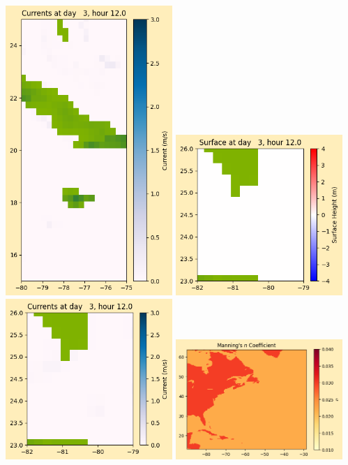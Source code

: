 \documentclass[11pt]{article}
\begin{document}
\includegraphics[width=0.475\textwidth]{frame0026fig1008.png}
\vskip 10pt 
\includegraphics[width=0.475\textwidth]{frame0026fig1009.png}
\includegraphics[width=0.475\textwidth]{frame0026fig1010.png}
\vskip 10pt 
\includegraphics[width=0.475\textwidth]{frame0026fig1011.png}
\end{document}
